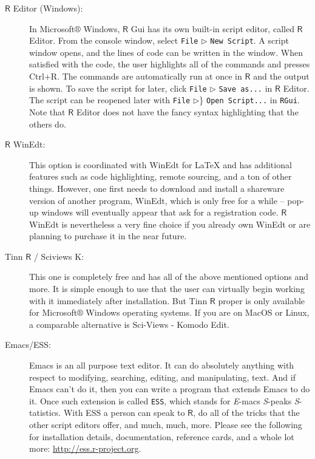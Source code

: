 \documentclass[captions=tableheading]{scrbook}
\begin{document}
\begin{description}
\item[\(\mathsf{R}\) Editor (Windows):] In Microsoft\(\circledR\) Windows, \(\mathsf{R}\) Gui has its own built-in script editor, called \(\mathsf{R}\) Editor. From the console window, select \texttt{File} \(\triangleright\) \texttt{New Script}. A script window opens, and the lines of code can be written in the window. When satisfied with the code, the user highlights all of the commands and presses \textsf{Ctrl+R}. The commands are automatically run at once in \(\mathsf{R}\) and the output is shown. To save the script for later, click \texttt{File} \(\triangleright\) \texttt{Save as...} in \(\mathsf{R}\) Editor. The script can be reopened later with \texttt{File} \(\triangleright\)\} \texttt{Open Script...} in \texttt{RGui}. Note that \(\mathsf{R}\) Editor does not have the fancy syntax highlighting that the others do.
\item[\(\mathsf{R}\) WinEdt:] This option is coordinated with WinEdt for \LaTeX{} and has additional features such as code highlighting, remote sourcing, and a ton of other things. However, one first needs to download and install a shareware version of another program, WinEdt, which is only free for a while -- pop-up windows will eventually appear that ask for a registration code. \(\mathsf{R}\) WinEdt is nevertheless a very fine choice if you already own WinEdt or are planning to purchase it in the near future.
\item[Tinn \(\mathsf{R}\) / Sciviews K:] This one is completely free and has all of the above mentioned options and more. It is simple enough to use that the user can virtually begin working with it immediately after installation. But Tinn \(\mathsf{R}\) proper is only available for Microsoft\(\circledR\) Windows operating systems. If you are on MacOS or Linux, a comparable alternative is Sci-Views - Komodo Edit.
\item[Emacs/ESS:] Emacs is an all purpose text editor. It can do absolutely anything with respect to modifying, searching, editing, and manipulating, text. And if Emacs can't do it, then you can write a program that extends Emacs to do it. Once such extension is called \texttt{ESS}, which stands for \emph{E}-macs \emph{S}-peaks \emph{S}-tatistics. With ESS a person can speak to \(\mathsf{R}\), do all of the tricks that the other script editors offer, and much, much, more. Please see the following for installation details, documentation, reference cards, and a whole lot more: \href{http://ess.r-project.org}{http://ess.r-project.org}.

\end{description}
\end{document}
